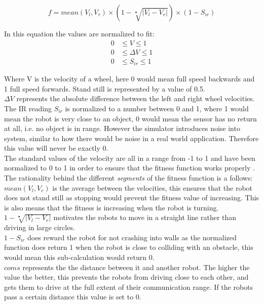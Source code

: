 \begin{equation}\label{eq:base_fittness}
f = mean(V_l, V_r) \times ( 1 - \sqrt[•]{|V_l - V_r|}) \times (1 - S_{ir})
\end{equation}

In this equation the values are normalized to fit:
\begin{align*}
	0  &\leq V \leq 1 \\  
	0  &\leq \Delta V  \leq 1 \\
	0  &\leq S_{ir} \leq 1
\end{align*}

Where V is the velocity of a wheel, here 0 would mean full speed backwards and 1 full speed forwards. Stand still is represented by a value of 0.5.\\
$\Delta V$ represents the absolute difference between the left and right wheel velocities. \\
The IR reading $S_{ir}$ is normalized to a number between 0 and 1, where 1 would mean the robot is very close to an object, 0 would mean the sensor has no return at all, i.e. no object is in range. However the simulator introduces noise into system, similar to how there would be noise in a real world application. Therefore this value will never be exactly 0. \\
The standard values of the velocity are all in a range from -1 to 1 and have been normalized to 0 to 1 in order to ensure that the fitness function works properly \cite{499791}.  \\
The rationality behind the different \textit{segments} of the fitness function is a follows: 
$mean(V_l, V_r)$ is the average between the velocities, this ensures that the robot does not stand still as stopping would prevent the fitness value of increasing. This is also means that the fitness is increasing when the robot is turning. \\
$1 - \sqrt[•]{|V_l - V_r|}$ motivates the robots to move in a straight line rather than driving in large circles. \\
$1 - S_{ir}$ does reward the robot for not crashing into walls as the normalized function does return 1 when the robot is close to colliding with an obstacle, this would mean this sub-calculation would return 0. \\
$coms$ represents the the distance between it and another robot. The higher the value the better, this prevents the robots from driving close to each other, and gets them to drive at the full extent of their communication range. If the robots pass a certain distance this value is set to 0. 

